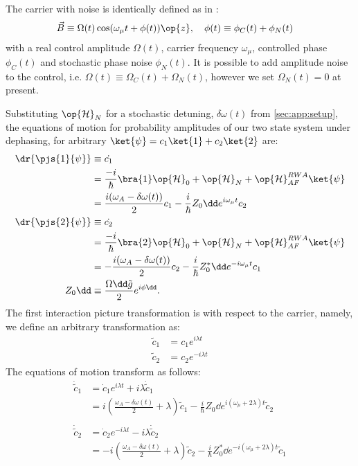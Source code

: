 The carrier with noise is identically defined as in \cite{soare2014}:
\begin{align}
\vec{B} &\equiv \Omega(t) \cos(\omega_\mu t + \phi(t)) \op{z}, \quad \phi(t) \equiv \phi_C(t) + \phi_N(t)
\end{align}
with a real control amplitude $\Omega(t)$, carrier frequency $\omega_\mu$, controlled phase $\phi_C(t)$ and stochastic phase noise $\phi_N(t)$.  It is possible to add amplitude noise to the control, i.e. $\Omega(t) \equiv \Omega_C(t) + \Omega_N(t)$, however we set $\Omega_N(t) =0$ at present. 

Substituting $\op{\mathcal{H}}_{N}$ for a stochastic detuning, $\delta \omega (t)$ from \cref{sec:app:setup}, the equations of motion for probability amplitudes of our two state system under dephasing, for arbitrary $\ket{\psi} = c_1 \ket{1} + c_2\ket{2} $ are:
\begin{align}
\dr{\pjs{1}{\psi}} &\equiv \dot{c_1} \\
& = \frac{-i}{\hbar}\bra{1} \op{\mathcal{H}}_0 + \op{\mathcal{H}}_{N} + \op{\mathcal{H}}_{AF}^{RWA}  \ket{\psi} \\
& = \frac{i(\omega_A - \delta\omega(t)) }{2}c_1 - \frac{i}{\hbar}Z_0\dd e^{i\omega_\mu t}c_2\\
\dr{\pjs{2}{\psi}} &\equiv \dot{c_2} \\
& = \frac{-i}{\hbar}\bra{2} \op{\mathcal{H}}_0 + \op{\mathcal{H}}_{N} + \op{\mathcal{H}}_{AF}^{RWA}  \ket{\psi} \\
& = -\frac{i(\omega_A - \delta\omega(t)) }{2}c_2 - \frac{i}{\hbar}Z_0^*\dd e^{-i\omega_\mu t}c_1 \\
\quad Z_0\dd &\equiv \frac{\Omega\dd\tilde{g}}{2}e^{i\phi\dd}.
\end{align}
The first interaction picture transformation is with respect to the carrier, namely, we define an arbitrary transformation as:
\begin{align}
\tilde{c}_1 &= c_1e^{i\lambda t} \\
\tilde{c}_2 &= c_2e^{-i\lambda t}
\end{align}
The equations of motion transform as follows:
\begin{align}
\dot{\tilde{c}}_1 & = \dot{c}_1 e^{i \lambda t} + i \lambda \dot{\tilde{c}}_1 \\
& =  i(\frac{\omega_A - \delta\omega(t)}{2} + \lambda)\tilde{c}_1 - \frac{i}{\hbar}Z_0\dd e^{i(\omega_\mu +2\lambda)t}\tilde{c}_2\\
& \nonumber \\
\dot{\tilde{c}}_2 & = \dot{c}_2 e^{-i \lambda t} - i \lambda \dot{\tilde{c}}_2 \\
& =  -i(\frac{\omega_A - \delta\omega(t)}{2} + \lambda)\tilde{c}_2- \frac{i}{\hbar}Z_0^*\dd e^{-i(\omega_\mu +2\lambda)t}\tilde{c}_1 \\
\end{align}
